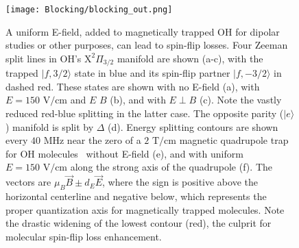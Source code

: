 \documentclass[%
 reprint,
 amsmath,amssymb,
 aps,
prl,
]{revtex4-1}
\newcommand{\red}[1]{{\color{black} #1}}
\newcommand{\epb}{{$E\!\perp\!B$}}
\begin{document}

\begin{figure}[tb]
\texttt{[image: Blocking/blocking\_out.png]}%
\caption{
A uniform E-field, added to magnetically trapped OH for dipolar studies or other purposes, can lead to spin-flip losses. Four Zeeman split lines in OH's $\mathrm{X}^2\Pi_{3/2}$ manifold are shown (a-c), with the trapped $|f,3/2\rangle$ state in blue and its spin-flip partner $|f,-3/2\rangle$ in dashed red. These states are shown with no E-field (a), with $E=150\text{ V/cm}$ and $E\,$\raisebox{0.5px}{$\parallel$}$\,B$
(b), and with \epb{} (c). Note the vastly reduced red-blue splitting in the latter case. The opposite parity ($|e\rangle$) manifold is split by $\Delta$ (d). Energy splitting contours are shown every $40\text{ MHz}$ near the zero of a $2\text{ T/cm}$ magnetic quadrupole trap for OH molecules~\cite{Stuhl2012uwave} without E-field (e), and with uniform $E=150\text{ V/cm}$ along the strong axis of the quadrupole (f). \red{The vectors are $\mu_B\vec{B}\pm d_E\vec{E}$, where the sign is positive above the horizontal centerline and negative below, which  represents the proper quantization axis for magnetically trapped molecules.} Note the drastic widening of the lowest contour (red), the culprit for molecular spin-flip loss enhancement.}
\label{fig:blocking}
\end{figure}
\end{document}
